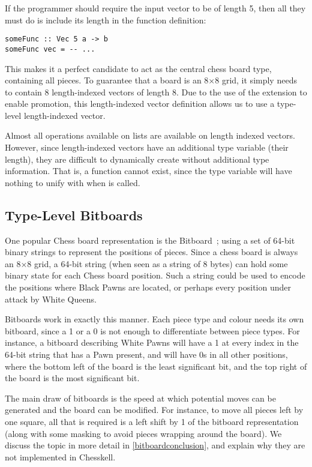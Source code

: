 If the programmer should require the input vector to be of length 5, then all they must do is include its length in the function definition:

\begin{lstlisting}
someFunc :: Vec 5 a -> b
someFunc vec = -- ...
\end{lstlisting}

This makes it a perfect candidate to act as the central chess board type, containing all pieces. To guarantee that a board is an 8×8 grid, it simply needs to contain 8 length-indexed vectors of length 8. Due to the use of the  extension to enable promotion, this length-indexed vector definition allows us to use a type-level length-indexed vector.

Almost all operations available on lists are available on length indexed vectors. However, since length-indexed vectors have an additional type variable (their length), they are difficult to dynamically create without additional type information. That is, a function  cannot exist, since the type variable  will have nothing to unify with when  is called.

\subsection{Type-Level Bitboards}

One popular Chess board representation is the Bitboard~\cite{bitboard}; using a set of 64-bit binary strings to represent the positions of pieces. Since a chess board is always an 8×8 grid, a 64-bit string (when seen as a string of 8 bytes) can hold some binary state for each Chess board position. Such a string could be used to encode the positions where Black Pawns are located, or perhaps every position under attack by White Queens.

Bitboards work in exactly this manner. Each piece type and colour needs its own bitboard, since a 1 or a 0 is not enough to differentiate between piece types. For instance, a bitboard describing White Pawns will have a 1 at every index in the 64-bit string that has a Pawn present, and will have 0s in all other positions, where the bottom left of the board is the least significant bit, and the top right of the board is the most significant bit.

The main draw of bitboards is the speed at which potential moves can be generated and the board can be modified. For instance, to move all pieces left by one square, all that is required is a left shift by 1 of the bitboard representation (along with some masking to avoid pieces wrapping around the board). We discuss the topic in more detail in \cref{bitboardconclusion}, and explain why they are not implemented in Chesskell.


